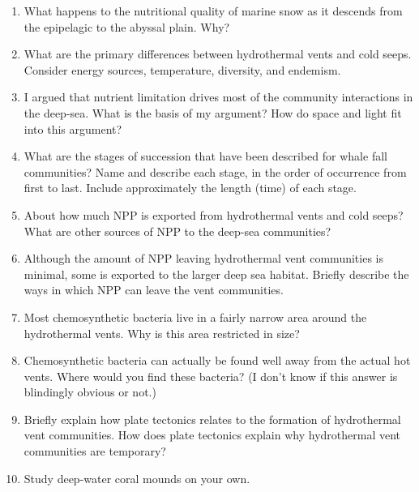\documentclass[nofonts, letterpaper]{tufte-handout}
\begin{document}
\begin{enumerate}
\item
  What happens to the nutritional quality of marine snow as it descends
  from the epipelagic to the abyssal plain. Why?
\item
  What are the primary differences between hydrothermal vents and cold
  seeps. Consider energy sources, temperature, diversity, and endemism.
\item
  I argued that nutrient limitation drives most of the community
  interactions in the deep-sea. What is the basis of my argument? How do
  space and light fit into this argument?
\item
  What are the stages of succession that have been described for whale
  fall communities? Name and describe each stage, in the order of
  occurrence from first to last. Include approximately the length (time) of each stage.
\item
  About how much NPP is exported from hydrothermal vents and cold seeps?
  What are other sources of NPP to the deep-sea communities?
\item
  Although the amount of NPP leaving hydrothermal vent communities is
  minimal, some is exported to the larger deep sea habitat. Briefly
  describe the ways in which NPP can leave the vent communities.
\item
  Most chemosynthetic bacteria live in a fairly narrow area around the
  hydrothermal vents. Why is this area restricted in size?
\item
  Chemosynthetic bacteria can actually be found well away from the
  actual hot vents. Where would you find these bacteria? (I don't know
  if this answer is blindingly obvious or not.)
\item
  Briefly explain how plate tectonics relates to the formation of
  hydrothermal vent communities. How does plate tectonics explain why
  hydrothermal vent communities are temporary?
\item
  Study deep-water coral mounds on your own.
 \end{enumerate}
\end{document}
